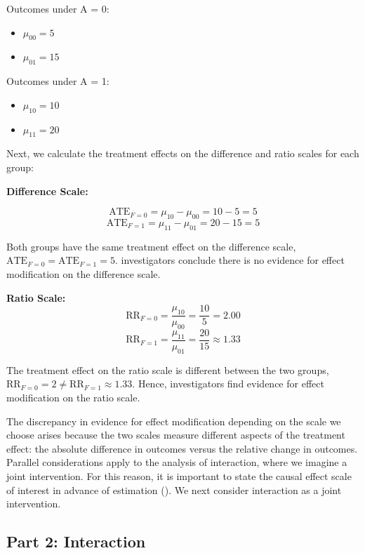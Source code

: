 \documentclass[
  single column]{article}
\providecommand{\tightlist}{%
  \setlength{\itemsep}{0pt}\setlength{\parskip}{0pt}}\usepackage{longtable,booktabs,array}
\begin{document}
Outcomes under A = 0:

\begin{itemize}
\tightlist
\item
  \(\mu_{00} = 5\)
\item
  \(\mu_{01} = 15\)
\end{itemize}

Outcomes under A = 1:

\begin{itemize}
\tightlist
\item
  \(\mu_{10} = 10\)
\item
  \(\mu_{11} = 20\)
\end{itemize}

Next, we calculate the treatment effects on the difference and ratio
scales for each group:

\textbf{Difference Scale:}

\[
\text{ATE}_{F = 0} = \mu_{10} - \mu_{00} = 10 - 5 = 5
\] \[
\text{ATE}_{F = 1} = \mu_{11} - \mu_{01} = 20 - 15 = 5
\]

Both groups have the same treatment effect on the difference scale,
\(\text{ATE}_{F = 0} = \text{ATE}_{F = 1} = 5\). investigators conclude
there is no evidence for effect modification on the difference scale.

\textbf{Ratio Scale:} \[
\text{RR}_{F = 0} = \frac{\mu_{10}}{\mu_{00}} = \frac{10}{5} = 2.00
\] \[
\text{RR}_{F = 1} = \frac{\mu_{11}}{\mu_{01}} = \frac{20}{15} \approx 1.33
\]

The treatment effect on the ratio scale is different between the two
groups, \(\text{RR}_{F = 0} = 2 \neq \text{RR}_{F = 1} \approx 1.33\).
Hence, investigators find evidence for effect modification on the ratio
scale.

The discrepancy in evidence for effect modification depending on the
scale we choose arises because the two scales measure different aspects
of the treatment effect: the absolute difference in outcomes versus the
relative change in outcomes. Parallel considerations apply to the
analysis of interaction, where we imagine a joint intervention. For this
reason, it is important to state the causal effect scale of interest in
advance of estimation (). We
next consider interaction as a joint intervention.

\subsection{Part 2: Interaction}\label{id-sec-2}
\end{document}
